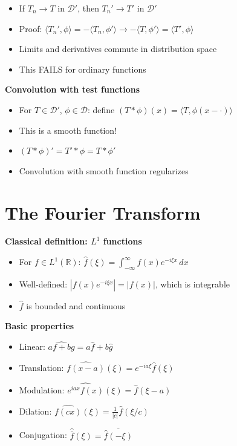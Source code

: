 \documentclass[
  10pt,
  letterpaper,
]{scrbook}
\providecommand{\tightlist}{%
  \setlength{\itemsep}{0pt}\setlength{\parskip}{0pt}}
\begin{document}
\begin{itemize}
\tightlist
\item
  If \(T_n \to T\) in \(\mathcal{D}'\), then \(T_n' \to T'\) in
  \(\mathcal{D}'\)
\item
  Proof:
  \(\langle T_n', \phi \rangle = -\langle T_n, \phi' \rangle \to -\langle T, \phi' \rangle = \langle T', \phi \rangle\)
\item
  Limits and derivatives commute in distribution space
\item
  This FAILS for ordinary functions
\end{itemize}

\textbf{Convolution with test functions}

\begin{itemize}
\tightlist
\item
  For \(T \in \mathcal{D}'\), \(\phi \in \mathcal{D}\): define
  \((T * \phi)(x) = \langle T, \phi(x - \cdot) \rangle\)
\item
  This is a smooth function!
\item
  \((T * \phi)' = T' * \phi = T * \phi'\)
\item
  Convolution with smooth function regularizes
\end{itemize}

\section{The Fourier Transform}\label{the-fourier-transform}

\textbf{Classical definition: \(L^1\) functions}

\begin{itemize}
\tightlist
\item
  For \(f \in L^1(\mathbb{R})\):
  \(\hat{f}(\xi) = \int_{-\infty}^\infty f(x) e^{-i\xi x}\, dx\)
\item
  Well-defined: \(|f(x)e^{-i\xi x}| = |f(x)|\), which is integrable
\item
  \(\hat{f}\) is bounded and continuous
\end{itemize}

\textbf{Basic properties}

\begin{itemize}
\tightlist
\item
  Linear: \(\widehat{af + bg} = a\hat{f} + b\hat{g}\)
\item
  Translation: \(\widehat{f(x-a)}(\xi) = e^{-ia\xi}\hat{f}(\xi)\)
\item
  Modulation: \(\widehat{e^{iax}f(x)}(\xi) = \hat{f}(\xi - a)\)
\item
  Dilation: \(\widehat{f(cx)}(\xi) = \frac{1}{|c|}\hat{f}(\xi/c)\)
\item
  Conjugation: \(\widehat{\bar{f}}(\xi) = \overline{\hat{f}(-\xi)}\)
\end{itemize}
\end{document}
